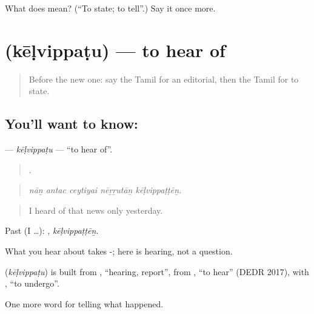 \begin{tcolorbox}[breakable,colback=teal!4,colframe=teal!35!black,title={Before you move on}]
What does  mean? (\textquotedblleft{}To state; to tell\textquotedblright{}.) Say it once more.
\end{tcolorbox}
\section[\texorpdfstring{\ta{கேள்விப்படு} (kēḷvippaṭu)}{கேள்விப்படு (kēḷvippaṭu)}]{ (kēḷvippaṭu) — to hear of}

\label{lesson:TA-C309-kelvippatu}



\begin{quote}
Before the new one: say the Tamil for an editorial, then the Tamil for to state.
\end{quote}

\subsection*{You'll want to know: }
\textbf{} — \emph{kēḷvippaṭu} — \textquotedblleft{}to hear of\textquotedblright{}.

\begin{quote}
    .
\end{quote}

\begin{quote}
\emph{nāṉ antac ceytiyai nēṟṟutāṉ kēḷvippaṭṭēṉ.}
\end{quote}

\begin{quote}
I heard of that news only yesterday.
\end{quote}

Past (I …): , \emph{kēḷvippaṭṭēṉ}.

What you hear about takes -;  here is hearing, not a question.

\begin{cousinweb}
\textbf{} (\emph{kēḷvippaṭu}) is built from , \textquotedblleft{}hearing, report\textquotedblright{}, from , \textquotedblleft{}to hear\textquotedblright{} (DEDR 2017), with , \textquotedblleft{}to undergo\textquotedblright{}.
\end{cousinweb}

\begin{grammarlens}[title={What you've built}]
One more word for telling what happened.
\end{grammarlens}


